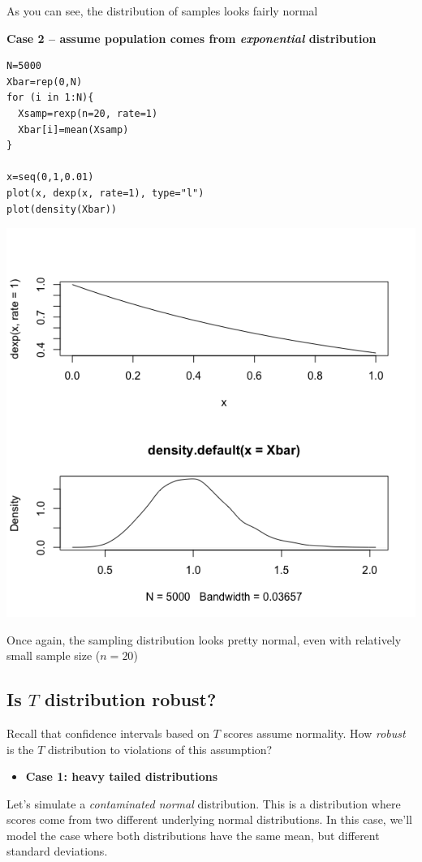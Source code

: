 \documentclass[11pt]{article}
\begin{document}
As you can see, the distribution of samples looks fairly normal

\textbf{Case 2 -- assume population comes from \emph{exponential} distribution}

\begin{verbatim}
N=5000
Xbar=rep(0,N)
for (i in 1:N){
  Xsamp=rexp(n=20, rate=1)
  Xbar[i]=mean(Xsamp)
}

x=seq(0,1,0.01)
plot(x, dexp(x, rate=1), type="l")
plot(density(Xbar))
\end{verbatim}

\includegraphics[width=.9\linewidth]{figures/week3/exponential.png}

Once again, the sampling distribution looks pretty normal, even with relatively small sample size ($n=20$)

\subsection*{Is $T$ distribution robust?}
\label{sec-3-2}

Recall that confidence intervals based on $T$ scores assume normality.  How \emph{robust} is the $T$ distribution to violations of this assumption?

\begin{itemize}
\item \textbf{Case 1: heavy tailed distributions}
\end{itemize}

Let's simulate a \emph{contaminated normal} distribution.  This is a distribution where scores come from two different underlying normal distributions.  In this case, we'll model the case where both distributions have the same mean, but different standard deviations.
\end{document}
